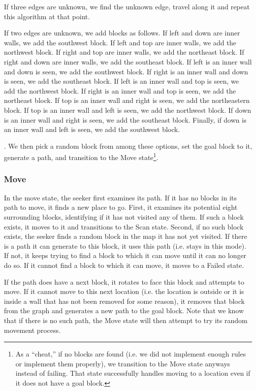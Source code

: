 \documentclass[12pt]{article}
\begin{document}
{If three edges are unknown, we find the unknown edge, travel along it and repeat this algorithm at that point.

If two edges are unknown, we add blocks as follows. If left and down are inner walls, we add the southwest block. If left and top are inner walls, we add the northwest block. If right and top are inner walls, we add the northeast block. If right and down are inner walls, we add the southeast block. If left is an inner wall and down is seen, we add the southwest block. If right is an inner wall and down is seen, we add the southeast block. If left is an inner wall and top is seen, we add the northwest block. If right is an inner wall and top is seen, we add the northeast block. If top is an inner wall and right is seen, we add the northeastern block. If top is an inner wall and left is seen, we add the northwest block. If down is an inner wall and right is seen, we add the southeast block. Finally, if down is an inner wall and left is seen, we add the southwest block.}. We then pick a random block from among these options, set the goal block to it, generate a path, and transition to the Move state\footnote{As a ``cheat,'' if no blocks are found (i.e. we did not implement enough rules or implement them properly), we transition to the Move state anyways instead of failing. That state successfully handles moving to a location even if it does not have a goal block.}. 

\subsubsection{Move}
In the move state, the seeker first examines its path. If it has no blocks in its path to move, it finds a new place to go. First, it examines its potential eight surrounding blocks, identifying if it has not visited any of them. If such a block exists, it moves to it and transitions to the Scan state. Second, if no such block exists, the seeker finds a random block in the map it has not yet visited. If there is a path it can generate to this block, it uses this path (i.e. stays in this mode). If not, it keeps trying to find a block to which it can move until it can no longer do so. If it cannot find a block to which it can move, it moves to a Failed state.   

If the path does have a next block, it rotates to face this block and attempts to move. If it cannot move to this next location (i.e. the location is outside or it is inside a wall that has not been removed for some reason), it removes that block from the graph and generates a new path to the goal block. Note that we know that if there is no such path, the Move state will then attempt to try its random movement process. 
\end{document}
